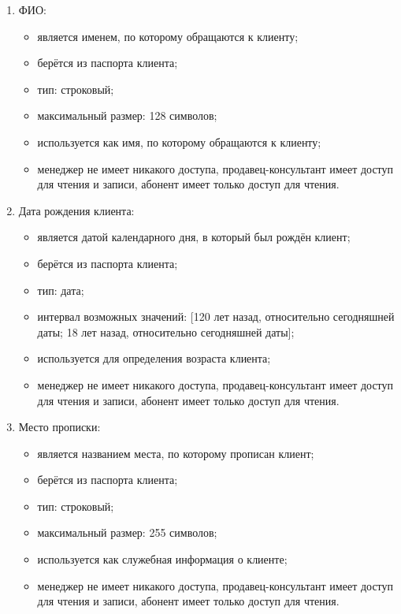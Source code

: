 \begin{enumerate}
\begin{enumerate}
        \item ФИО:
        \begin{itemize}
            \item является именем, по которому обращаются к клиенту;
            \item берётся из паспорта клиента;
            \item тип: строковый;
            \item максимальный размер: 128 символов;
            \item используется как имя, по которому обращаются к клиенту;
            \item менеджер не имеет никакого доступа, продавец-консультант имеет доступ для чтения и записи, абонент имеет только доступ для чтения.
        \end{itemize}

        \item Дата рождения клиента:
        \begin{itemize}
            \item является датой календарного дня, в который был рождён клиент;
            \item берётся из паспорта клиента;
            \item тип: дата;
            \item интервал возможных значений: [120 лет назад, относительно сегодняшней даты; 18 лет назад, относительно сегодняшней даты];
            \item используется для определения возраста клиента;
            \item менеджер не имеет никакого доступа, продавец-консультант имеет доступ для чтения и записи, абонент имеет только доступ для чтения.
        \end{itemize}

        \item Место прописки:
        \begin{itemize}
            \item является названием места, по которому прописан клиент;
            \item берётся из паспорта клиента;
            \item тип: строковый;
            \item максимальный размер: 255 символов;
            \item используется как служебная информация о клиенте;
            \item менеджер не имеет никакого доступа, продавец-консультант имеет доступ для чтения и записи, абонент имеет только доступ для чтения.
        \end{itemize}
    \end{enumerate}



\end{enumerate}
